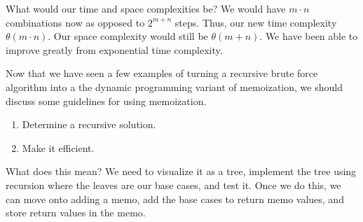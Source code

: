 \documentclass[12pt,dvipsnames,svgnames,x11names]{article}
\begin{document}
What would our time and space complexities be? We would have \(m\cdot n\) combinations now as
opposed to \(2^{m + n}\) steps. Thus, our new time complexity \(\theta (m\cdot n)\). Our space
complexity would still be \(\theta (m + n)\). We have been able to improve greatly from exponential
time complexity.
\par\medskip
Now that we have seen a few examples of turning a recursive brute force algorithm into a the 
dynamic programming variant of memoization, we should discuss some guidelines for using 
memoization.
\begin{enumerate}
	\item Determine a recursive solution.
	\item Make it efficient.
\end{enumerate}
What does this mean? We need to visualize it as a tree, implement the tree using recursion where the
leaves are our base cases, and test it. Once we do this, we can move onto adding a memo, add the
base cases to return memo values, and store return values in the memo.
\par\medskip
\end{document}
